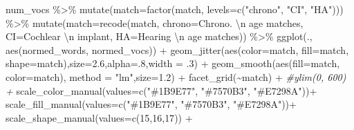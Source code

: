 \documentclass[
]{article}
\newenvironment{Shaded}{\begin{snugshade}}{\end{snugshade}}
\newcommand{\AttributeTok}[1]{\textcolor[rgb]{0.77,0.63,0.00}{#1}}
\newcommand{\CommentTok}[1]{\textcolor[rgb]{0.56,0.35,0.01}{\textit{#1}}}
\newcommand{\DecValTok}[1]{\textcolor[rgb]{0.00,0.00,0.81}{#1}}
\newcommand{\FloatTok}[1]{\textcolor[rgb]{0.00,0.00,0.81}{#1}}
\newcommand{\FunctionTok}[1]{\textcolor[rgb]{0.00,0.00,0.00}{#1}}
\newcommand{\NormalTok}[1]{#1}
\newcommand{\SpecialCharTok}[1]{\textcolor[rgb]{0.00,0.00,0.00}{#1}}
\newcommand{\StringTok}[1]{\textcolor[rgb]{0.31,0.60,0.02}{#1}}
\begin{document}
\begin{Shaded}
\begin{Highlighting}[]
\NormalTok{num\_vocs }\SpecialCharTok{\%\textgreater{}\%}
  \FunctionTok{mutate}\NormalTok{(}\AttributeTok{match=}\FunctionTok{factor}\NormalTok{(match, }\AttributeTok{levels=}\FunctionTok{c}\NormalTok{(}\StringTok{"chrono"}\NormalTok{, }\StringTok{"CI"}\NormalTok{, }\StringTok{"HA"}\NormalTok{))) }\SpecialCharTok{\%\textgreater{}\%}
  \FunctionTok{mutate}\NormalTok{(}\AttributeTok{match=}\FunctionTok{recode}\NormalTok{(match,}
                      \AttributeTok{chrono=}\StringTok{\textquotesingle{}Chrono. }\SpecialCharTok{\textbackslash{}n}\StringTok{ age matches\textquotesingle{}}\NormalTok{,}
                      \AttributeTok{CI=}\StringTok{\textquotesingle{}Cochlear }\SpecialCharTok{\textbackslash{}n}\StringTok{ implant\textquotesingle{}}\NormalTok{,}
                      \AttributeTok{HA=}\StringTok{\textquotesingle{}Hearing }\SpecialCharTok{\textbackslash{}n}\StringTok{ age matches\textquotesingle{}}\NormalTok{)) }\SpecialCharTok{\%\textgreater{}\%}
\FunctionTok{ggplot}\NormalTok{(., }\FunctionTok{aes}\NormalTok{(normed\_words, normed\_vocs)) }\SpecialCharTok{+}
  \FunctionTok{geom\_jitter}\NormalTok{(}\FunctionTok{aes}\NormalTok{(}\AttributeTok{color=}\NormalTok{match, }\AttributeTok{fill=}\NormalTok{match, }\AttributeTok{shape=}\NormalTok{match),}\AttributeTok{size=}\FloatTok{2.6}\NormalTok{,}\AttributeTok{alpha=}\NormalTok{.}\DecValTok{8}\NormalTok{,}\AttributeTok{width =}\NormalTok{ .}\DecValTok{3}\NormalTok{) }\SpecialCharTok{+}
  \FunctionTok{geom\_smooth}\NormalTok{(}\FunctionTok{aes}\NormalTok{(}\AttributeTok{fill=}\NormalTok{match, }\AttributeTok{color=}\NormalTok{match), }\AttributeTok{method =} \StringTok{"lm"}\NormalTok{,}\AttributeTok{size=}\FloatTok{1.2}\NormalTok{) }\SpecialCharTok{+} 
  \FunctionTok{facet\_grid}\NormalTok{(}\SpecialCharTok{\textasciitilde{}}\NormalTok{match) }\SpecialCharTok{+}
  \CommentTok{\#ylim(0, 600) +}
    \FunctionTok{scale\_color\_manual}\NormalTok{(}\AttributeTok{values=}\FunctionTok{c}\NormalTok{(}\StringTok{"\#1B9E77"}\NormalTok{, }\StringTok{"\#7570B3"}\NormalTok{, }\StringTok{"\#E7298A"}\NormalTok{))}\SpecialCharTok{+}
  \FunctionTok{scale\_fill\_manual}\NormalTok{(}\AttributeTok{values=}\FunctionTok{c}\NormalTok{(}\StringTok{"\#1B9E77"}\NormalTok{, }\StringTok{"\#7570B3"}\NormalTok{, }\StringTok{"\#E7298A"}\NormalTok{))}\SpecialCharTok{+}
  \FunctionTok{scale\_shape\_manual}\NormalTok{(}\AttributeTok{values=}\FunctionTok{c}\NormalTok{(}\DecValTok{15}\NormalTok{,}\DecValTok{16}\NormalTok{,}\DecValTok{17}\NormalTok{)) }\SpecialCharTok{+}

\end{Highlighting}
\end{Shaded}
\end{document}
